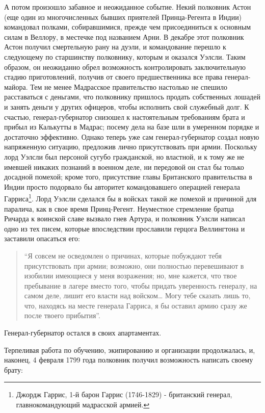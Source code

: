 \documentclass[
  oneside,
  12pt,
  titlepage]{book}
\begin{document}
А потом произошло забавное и неожиданное событие. Некий полковник Астон (еще один из многочисленных бывших приятелей Принца-Регента в Индии) командовал полками, собиравшимися, прежде чем присоединиться к основным силам в Веллору, в местечке под названием Арни. В декабре этот полковник Астон получил смертельную рану на дуэли, и командование перешло к следующему по старшинству полковнику, которым и оказался Уэлсли. Таким образом, он неожиданно обрел возможность контролировать заключительную стадию приготовлений, получив от своего предшественника все права генерал-майора. Тем не менее Мадрасское правительство настолько не спешило расставаться с деньгами, что полковнику пришлось продать собственных лошадей и занять деньги у других офицеров, чтобы исполнить свой служебный долг. К счастью, генерал-губернатор снизошел к настоятельным требованиям брата и прибыл из Калькутты в Мадрас; посему дела на базе шли в умеренном порядке и достаточно эффективно. Однако теперь уже сам генерал-губернатор создал новую напряженную ситуацию, предложив лично присутствовать при армии. Поскольку лорд Уэлсли был персоной сугубо гражданской, но властной, и к тому же не имевшей никаких познаний в военном деле, ни передовой он стал бы только досадной помехой; кроме того, присутствие главы Британского правительства в Индии просто подорвало бы авторитет командовавшего операцией генерала Гарриса\footnote{Джордж Гаррис, 1-й барон Гаррис (1746-1829) - британский генерал, главнокомандующий мадрасской армией.}. Лорд Уэлсли сделался бы в войсках такой же помехой и причиной для паралича, как в свое время Принц-Регент. Неуместное стремление братца Ричарда к воинской славе вызвало гнев Артура, и полковник Уэлсли написал одно из тех писем, которые впоследствии прославили герцога Веллингтона и заставили опасаться его:

\begin{quote}
``Я совсем не осведомлен о причинах, которые побуждают тебя присутствовать при армии; возможно, они полностью перевешивают в изобилии имеющиеся у меня возражения; но, мне кажется, что твое пребывание в лагере вместо того, чтобы придать уверенность генералу, на самом деле, лишит его власти над войском\ldots{} Могу тебе сказать лишь то, что, находясь на месте генерала Гарриса, я бы оставил армию сразу же после твоего прибытия''.
\end{quote}

Генерал-губернатор остался в своих апартаментах.

Терпеливая работа по обучению, экипированию и организации продолжалась, и, наконец, 4 февраля 1799 года полковник получил возможность написать своему брату:
\end{document}
